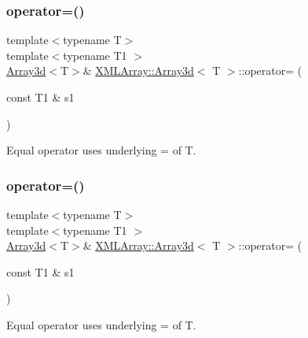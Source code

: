 \subsubsection{\texorpdfstring{operator=()}{operator=()}\hspace{0.1cm}{\footnotesize\ttfamily [5/6]}}
{\footnotesize\ttfamily template$<$typename T$>$ \\
template$<$typename T1 $>$ \\
\mbox{\hyperlink{classXMLArray_1_1Array3d}{Array3d}}$<$T$>$\& \mbox{\hyperlink{classXMLArray_1_1Array3d}{X\+M\+L\+Array\+::\+Array3d}}$<$ T $>$\+::operator= (\begin{DoxyParamCaption}\item[{const T1 \&}]{s1 }\end{DoxyParamCaption})\hspace{0.3cm}{\ttfamily [inline]}}



Equal operator uses underlying = of T. 

\mbox{\label{classXMLArray_1_1Array3d_a64543f39150c0d468eb6bef6ea73c1c6}} 
\subsubsection{\texorpdfstring{operator=()}{operator=()}\hspace{0.1cm}{\footnotesize\ttfamily [6/6]}}
{\footnotesize\ttfamily template$<$typename T$>$ \\
template$<$typename T1 $>$ \\
\mbox{\hyperlink{classXMLArray_1_1Array3d}{Array3d}}$<$T$>$\& \mbox{\hyperlink{classXMLArray_1_1Array3d}{X\+M\+L\+Array\+::\+Array3d}}$<$ T $>$\+::operator= (\begin{DoxyParamCaption}\item[{const T1 \&}]{s1 }\end{DoxyParamCaption})\hspace{0.3cm}{\ttfamily [inline]}}



Equal operator uses underlying = of T. 

\mbox{\label{classXMLArray_1_1Array3d_afe27b06ef40efdd87dbea00eafa35287}} 
